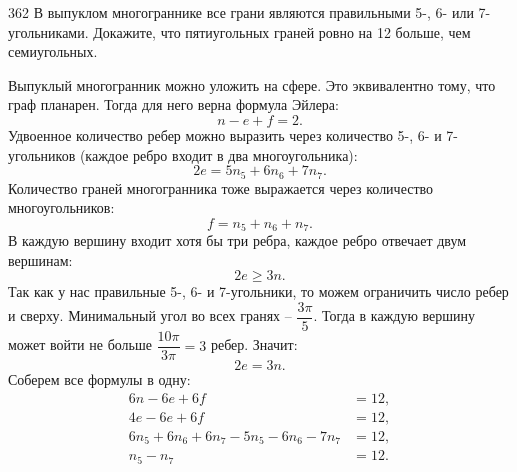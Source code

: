 \begin{task}{362}
	В выпуклом многограннике все грани являются правильными 5-, 6- или 7-угольниками. Докажите, что пятиугольных граней ровно на 12 больше, чем семиугольных.
\end{task}

\begin{solution} 
	Выпуклый многогранник можно уложить на сфере. Это эквивалентно тому, что граф планарен. Тогда для него верна формула Эйлера: \[ n - e + f = 2.\] Удвоенное количество ребер можно выразить через количество 5-, 6- и 7-угольников (каждое ребро входит в два многоугольника): \[ 2 e = 5 n_5 + 6 n_6 + 7 n_7.\] Количество граней многогранника тоже выражается через количество многоугольников: \[ f = n_5 + n_6 + n_7.\] В каждую вершину входит хотя бы три ребра, каждое ребро отвечает двум вершинам: \[ 2 e \geq 3 n.\] Так как у нас правильные 5-, 6- и 7-угольники, то можем ограничить число ребер и сверху. Минимальный угол во всех гранях -- $\dfrac{3 \pi}{5}$. Тогда в каждую вершину может войти не больше $ \dfrac{10 \pi}{3 \pi} = 3$ ребер. Значит: \[ 2 e = 3 n.\] Соберем все формулы в одну: 
	\begin{align*}
	    6n - 6e + 6f &= 12, \\
	    4e - 6e + 6f &= 12, \\ 
	    6n_5 + 6n_6 + 6n_7 - 5n_5 - 6n_6 - 7n_7 &= 12, \\
	    n_5 - n_7 &= 12.
	\end{align*}
\end{solution}